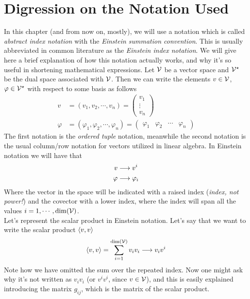 \documentclass[../complete.tex]{subfiles}
\begin{document}
\section{Digression on the Notation Used}
In this chapter (and from now on, mostly), we will use a notation which is called \textit{abstract index notation} with the \textit{Einstein summation convention}. This is usually abbreviated in common literature as the \textit{Einstein index notation}. We will give here a brief explanation of how this notation actually works, and why it's so useful in shortening mathematical expressions. Let $\mathcal{V}$ be a vector space and $\mathcal{V}^\star$ be the dual space associated with $\mathcal{V}$. Then we can write the elements $v\in\mathcal{V}$, $\varphi\in\mathcal{V}^\star$ with respect to some basis as follows
\begin{equation}
	\begin{aligned}
		v&=(v_1,v_2,\cdots,v_n)=\begin{pmatrix}v_1\\\vdots\\v_n\end{pmatrix}\\
		\varphi&=(\varphi_1,\varphi_2,\cdots,\varphi_n)=\begin{pmatrix}\varphi_1&\varphi_2&\cdots&\varphi_n\end{pmatrix}
	\end{aligned}
	\label{eq:contrcovvector}
\end{equation}
The first notation is the \textit{ordered tuple} notation, meanwhile the second notation is the usual column/row notation for vectors utilized in linear algebra. In Einstein notation we will have that
\begin{equation}
	\begin{aligned}
		v&\overset{}{\longrightarrow} v^i\\
		\varphi&\overset{}{\longrightarrow} \varphi_i
	\end{aligned}
	\label{eq:einsteinnot1}
\end{equation}
Where the vector in the space will be indicated with a raised index (\emph{index, not power!}) and the covector with a lower index, where the index will span all the values $i=1,\cdots,\dim(\mathcal{V})$.\\
Let's represent the scalar product in Einstein notation. Let's say that we want to write the scalar product $\langle v, v \rangle$
\begin{equation}
	\langle v, v \rangle=\sum_{i=1}^{\dim(\mathcal{V})}v_iv_i\overset{}{\longrightarrow} v_iv^i
	\label{eq:spreinstein2}
\end{equation}
Note how we have omitted the sum over the repeated index. Now one might ask why it's not written as $v_iv_i$ (or $v^iv^i$, since $v\in\mathcal{V}$), and this is easily explained introducing the matrix $g_{ij}$, which is the matrix of the scalar product.\\
\end{document}
